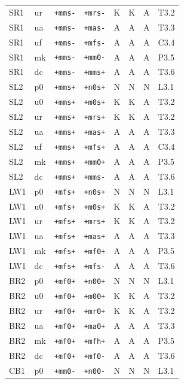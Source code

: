 {\begin{longtable}{@{}llllcccl@{}}
SR1 & ur & \texttt{+mms-} & \texttt{+mrs-} & K & K & A & T3.2 \\
SR1 & ua & \texttt{+mms-} & \texttt{+mas-} & A & A & A & T3.3 \\
SR1 & uf & \texttt{+mms-} & \texttt{+mfs-} & A & A & A & C3.4 \\
SR1 & mk & \texttt{+mms-} & \texttt{+mm0-} & A & A & A & P3.5 \\
SR1 & dc & \texttt{+mms-} & \texttt{+mms+} & A & A & A & T3.6 \\
SL2 & p0 & \texttt{+mms+} & \texttt{+n0s+} & N & N & N & L3.1 \\
SL2 & u0 & \texttt{+mms+} & \texttt{+m0s+} & K & K & A & T3.2 \\
SL2 & ur & \texttt{+mms+} & \texttt{+mrs+} & K & K & A & T3.2 \\
SL2 & ua & \texttt{+mms+} & \texttt{+mas+} & A & A & A & T3.3 \\
SL2 & uf & \texttt{+mms+} & \texttt{+mfs+} & A & A & A & C3.4 \\
SL2 & mk & \texttt{+mms+} & \texttt{+mm0+} & A & A & A & P3.5 \\
SL2 & dc & \texttt{+mms+} & \texttt{+mms-} & A & A & A & T3.6 \\
LW1 & p0 & \texttt{+mfs+} & \texttt{+n0s+} & N & N & N & L3.1 \\
LW1 & u0 & \texttt{+mfs+} & \texttt{+m0s+} & K & K & A & T3.2 \\
LW1 & ur & \texttt{+mfs+} & \texttt{+mrs+} & K & K & A & T3.2 \\
LW1 & ua & \texttt{+mfs+} & \texttt{+mas+} & A & A & A & T3.3 \\
LW1 & mk & \texttt{+mfs+} & \texttt{+mf0+} & A & A & A & P3.5 \\
LW1 & dc & \texttt{+mfs+} & \texttt{+mfs-} & A & A & A & T3.6 \\
BR2 & p0 & \texttt{+mf0+} & \texttt{+n00+} & N & N & N & L3.1 \\
BR2 & u0 & \texttt{+mf0+} & \texttt{+m00+} & K & K & A & T3.2 \\
BR2 & ur & \texttt{+mf0+} & \texttt{+mr0+} & K & K & A & T3.2 \\
BR2 & ua & \texttt{+mf0+} & \texttt{+ma0+} & A & A & A & T3.3 \\
BR2 & mk & \texttt{+mf0+} & \texttt{+mfh+} & A & A & A & P3.5 \\
BR2 & dc & \texttt{+mf0+} & \texttt{+mf0-} & A & A & A & T3.6 \\
CB1 & p0 & \texttt{+mm0-} & \texttt{+n00-} & N & N & N & L3.1 \\

\end{longtable}}
